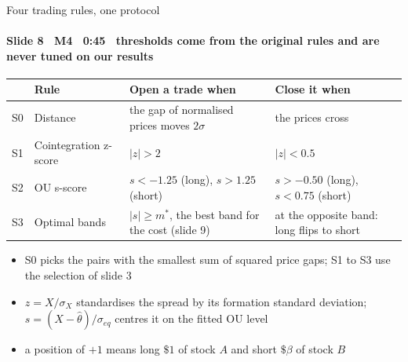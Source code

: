 \begin{frame}{Four trading rules, one protocol}
\framesubtitle{Slide 8 \textbullet\ M4 \textbullet\ 0:45 \textbullet\ thresholds come from the original rules and are never tuned on our results}
\vspace{-2pt}
\footnotesize\setlength{\tabcolsep}{4pt}
\begin{tabular}{@{}l@{\ \ }p{2.8cm}p{5.9cm}p{4.6cm}@{}}
  \toprule
  & Rule & Open a trade when & Close it when \\
  \midrule
  S0 & Distance & the gap of normalised prices moves $2\sigma$ & the prices cross \\
  S1 & Cointegration z-score & $|z|>2$ & $|z|<0.5$ \\
  S2 & OU s-score & $s<-1.25$ (long), $s>1.25$ (short) & $s>-0.50$ (long), $s<0.75$ (short) \\
  S3 & Optimal bands & $|s|\ge m^*$, the best band for the cost (slide 9) & at the opposite band: long flips to short \\
  \bottomrule
\end{tabular}
\vspace{6pt}
\begin{itemize}\setlength{\itemsep}{2pt}
  \item S0 picks the pairs with the smallest sum of squared price gaps; S1 to S3 use the selection of slide 3
  \item $z=X/\sigma_X$ standardises the spread by its formation standard deviation; $s=(X-\hat\theta)/\sigma_{eq}$ centres it on the fitted OU level
  \item a position of $+1$ means long $\$1$ of stock $A$ and short $\$\beta$ of stock $B$
\end{itemize}
\end{frame}
